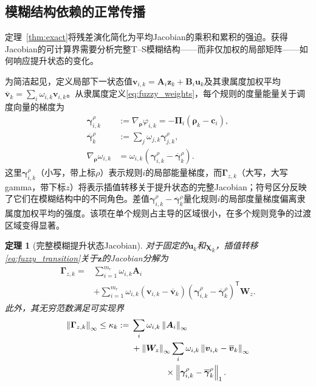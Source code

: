 \documentclass[journal]{IEEEtran}
\newtheorem{theorem}{定理}
\newcommand{\norm}[1]{\left\lVert #1\right\rVert}
\newcommand{\T}{\mathsf T}
\newcommand{\1}{\bm 1}
\begin{document}
\subsection{模糊结构依赖的正常传播}
定理~\ref{thm:exact}将残差演化简化为平均Jacobian的乘积和累积的强迫。获得Jacobian的可计算界需要分析完整T--S模糊结构——而非仅加权的局部矩阵——如何响应提升状态的变化。

为简洁起见，定义局部下一状态值$\bm v_{i,k}=\bm A_i\bm z_k+\bm B_i\bm u_k$及其隶属度加权平均$\overline{\bm v}_k=\sum_i\omega_{i,k}\bm v_{i,k}$。从隶属度定义\eqref{eq:fuzzy_weights}，每个规则的度量能量关于调度向量的梯度为
\begin{equation}
\begin{aligned}
\bm\gamma_{i,k}^{\rho}
&:=\nabla_{\bm\rho}\varphi_{i,k}
=-\bm\Pi_i(\bm\rho_k-\bm c_i),\\
\overline{\bm\gamma}_k^{\rho}
&:=\sum_j\omega_{j,k}\bm\gamma_{j,k}^{\rho},\\
\nabla_{\bm\rho}\omega_{i,k}
&=\omega_{i,k}
(\bm\gamma_{i,k}^{\rho}-\overline{\bm\gamma}_k^{\rho}).
\end{aligned}
\label{eq:weight_gradient}
\end{equation}
这里$\bm\gamma_{i,k}^{\rho}$（小写，带上标$\rho$）表示规则$i$的局部能量梯度，而$\bm\Gamma_{z,k}$（大写，大写gamma，带下标$z$）将表示插值转移关于提升状态的完整Jacobian；符号区分反映了它们在模糊结构中的不同角色。差值$\bm\gamma_{i,k}^{\rho}-\overline{\bm\gamma}_k^{\rho}$量化规则$i$的局部度量梯度偏离隶属度加权平均的强度。该项在单个规则占主导的区域很小，在多个规则竞争的过渡区域变得显著。

\begin{theorem}[完整模糊提升状态Jacobian]
\label{thm:jacobian}
对于固定的$\bm u_k$和$\bm\chi_k$，插值转移\eqref{eq:fuzzy_transition}关于$\bm z$的Jacobian分解为
\begin{equation}
\begin{aligned}
\bm\Gamma_{z,k}
={}&\sum_{i=1}^{m_r}\omega_{i,k}\bm A_i\\
&+\sum_{i=1}^{m_r}\omega_{i,k}
(\bm v_{i,k}-\overline{\bm v}_k)
(\bm\gamma_{i,k}^{\rho}
-\overline{\bm\gamma}_k^{\rho})^\T\bm W_z .
\end{aligned}
\label{eq:complete_jacobian}
\end{equation}
此外，其无穷范数满足可实现界
\begin{equation}
\begin{aligned}
\norm{\bm\Gamma_{z,k}}_\infty\leq\kappa_k:={}&
\sum_i\omega_{i,k}\norm{\bm A_i}_\infty\\
&+\norm{\bm W_z}_\infty
\sum_i\omega_{i,k}
\norm{\bm v_{i,k}-\overline{\bm v}_k}_\infty\\
&\hspace{14mm}\times
\norm{\bm\gamma_{i,k}^{\rho}
-\overline{\bm\gamma}_k^{\rho}}_1 .
\end{aligned}
\label{eq:jacobian_bound}
\end{equation}
\end{theorem}
\end{document}

